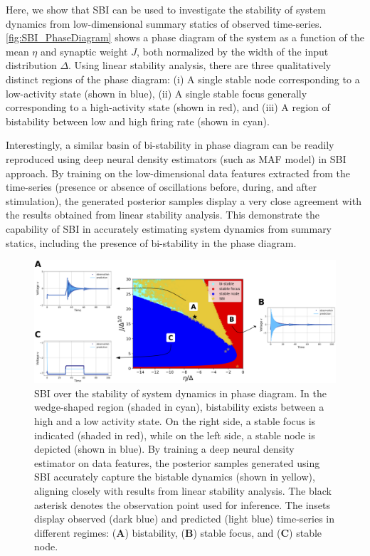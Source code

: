 \documentclass[preprint,11pt,authoryear]{elsarticle}
\begin{document}
Here, we show that SBI can be used to investigate the stability of system dynamics from low-dimensional summary statics of observed time-series. \autoref{fig:SBI_PhaseDiagram} shows a phase diagram of the system as a function of the mean $\eta$ and synaptic weight $J$, both normalized by the width of the input distribution $\Delta$. Using linear stability analysis, there are three qualitatively distinct regions of the phase diagram: (i) A single stable node corresponding to a low-activity state (shown in blue), (ii) A single stable focus generally corresponding to a high-activity state (shown in red), and (iii) A region of bistability between low and high firing rate (shown in cyan).  

Interestingly, a similar basin of bi-stability in phase diagram can be readily reproduced using deep neural density estimators (such as MAF model) in SBI approach. By training on the low-dimensional data features extracted from the time-series (presence or absence of oscillations before, during, and after stimulation), the generated posterior samples display a very close agreement with the results obtained from linear stability analysis. This demonstrate the capability of SBI in accurately estimating system dynamics from summary statics, including the presence of bi-stability in the phase diagram.


 
\begin{figure}
    \centering
    \includegraphics[width=\linewidth]{Figs/Fig8.png}
    \caption{SBI over the stability of system dynamics in phase diagram. In the wedge-shaped region (shaded in cyan), bistability exists between a high and a low activity state. On the right side, a stable focus is indicated (shaded in red), while on the left side, a stable node is depicted (shown in blue). By training a deep neural density estimator on data features, the posterior samples generated using SBI accurately capture the bistable dynamics (shown in yellow), aligning closely with results from linear stability analysis. The black asterisk denotes the observation point used for inference. The insets display observed (dark blue) and predicted (light blue) time-series in different regimes: (\textbf{A}) bistability, (\textbf{B}) stable focus, and (\textbf{C}) stable node.}
    \label{fig:SBI_PhaseDiagram}
\end{figure}
\end{document}
